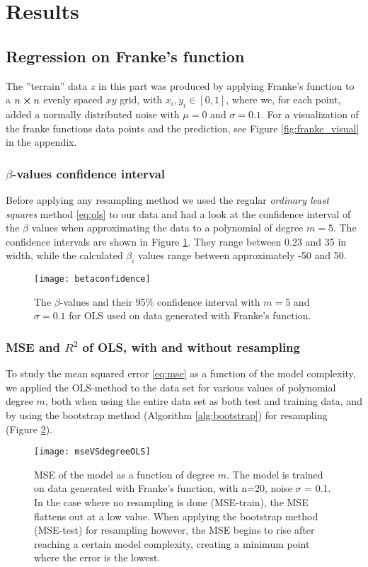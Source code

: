 \section{Results}
\label{sec:results}
\subsection{Regression on Franke's function}
The {''}terrain'' data $z$ in this part was produced by applying Franke's function to a $n\cross n$ evenly spaced $xy$ grid, with $x_i,y_i\in [0,1]$, where we, for each point, added a normally distributed noise with $\mu = 0$ and $\sigma = 0.1$.
For a visualization of the franke functions data points and the prediction, see Figure \ref{fig:franke_visual} in the appendix.
\subsubsection{$\beta$-values confidence interval}
Before applying any resampling method we used the regular \emph{ordinary least squares} method \eqref{eq:ols} to our data and had a look at the confidence interval of the $\beta$ values when approximating the data to a polynomial of degree $m=5$. The confidence intervals are shown in Figure \ref{fig:betaconfidence}.
They range between 0.23 and 35 in width, while the calculated $\beta_i$ values range between approximately -50 and 50.
\begin{figure}[htbp]
	\centering
	\texttt{[image: betaconfidence]}
	\caption{The $\beta$-values and their 95\% confidence interval with $m=5$ and $\sigma=0.1$ for OLS used on data generated with Franke's function.}
	\label{fig:betaconfidence}
\end{figure}

\subsubsection{MSE and $R^2$ of OLS, with and without resampling}
To study the mean squared error \eqref{eq:mse} as a function of the model complexity, we applied the OLS-method to the data set for various values of polynomial degree $m$, both when using the entire data set as both test and training data, and by using the bootstrap method (Algorithm \ref{alg:bootstrap}) for resampling (Figure \ref{fig:mseVSdegreeOLS}).

\begin{figure}[htbp]
	\centering
	\texttt{[image: mseVSdegreeOLS]}
	\caption{MSE of the model as a function of degree $m$. The model is trained on data generated with Franke's function, with n=20, noise $\sigma$ = 0.1. In the case where no resampling is done (MSE-train), the MSE flattens out at a low value. When applying the bootstrap method (MSE-test) for resampling however, the MSE begins to rise after reaching a certain model complexity, creating a minimum point where the error is the lowest.}
	\label{fig:mseVSdegreeOLS}
\end{figure}

